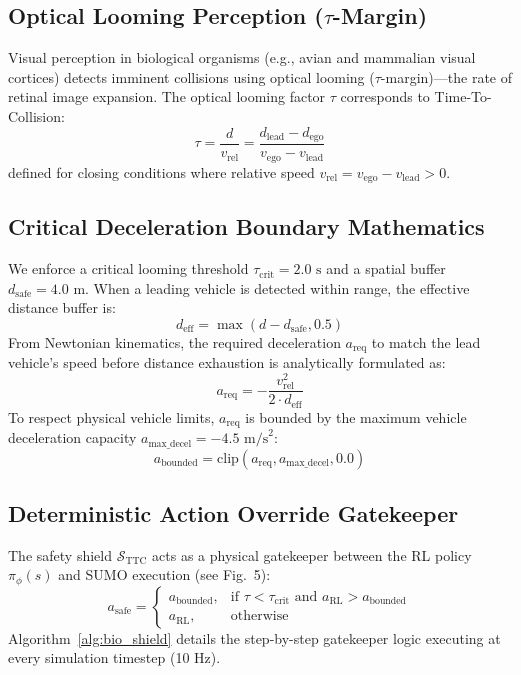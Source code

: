 \documentclass{svproc}
\begin{document}
\subsection{Optical Looming Perception ($\tau$-Margin)}
Visual perception in biological organisms (e.g., avian and mammalian visual cortices) detects imminent collisions using optical looming ($\tau$-margin)---the rate of retinal image expansion. The optical looming factor $\tau$ corresponds to Time-To-Collision:
\begin{equation}\label{eq:tau}
\tau = \frac{d}{v_{\text{rel}}} = \frac{d_{\text{lead}} - d_{\text{ego}}}{v_{\text{ego}} - v_{\text{lead}}}
\end{equation}
defined for closing conditions where relative speed $v_{\text{rel}} = v_{\text{ego}} - v_{\text{lead}} > 0$.

\subsection{Critical Deceleration Boundary Mathematics}
We enforce a critical looming threshold $\tau_{\text{crit}} = 2.0\text{ s}$ and a spatial buffer $d_{\text{safe}} = 4.0\text{ m}$. When a leading vehicle is detected within range, the effective distance buffer is:
\begin{equation}
d_{\text{eff}} = \max\left(d - d_{\text{safe}}, 0.5\right)
\end{equation}
From Newtonian kinematics, the required deceleration $a_{\text{req}}$ to match the lead vehicle's speed before distance exhaustion is analytically formulated as:
\begin{equation}\label{eq:areq}
a_{\text{req}} = -\frac{v_{\text{rel}}^2}{2 \cdot d_{\text{eff}}}
\end{equation}
To respect physical vehicle limits, $a_{\text{req}}$ is bounded by the maximum vehicle deceleration capacity $a_{\text{max\_decel}} = -4.5\text{ m/s}^2$:
\begin{equation}
a_{\text{bounded}} = \text{clip}\left(a_{\text{req}}, a_{\text{max\_decel}}, 0.0\right)
\end{equation}

\subsection{Deterministic Action Override Gatekeeper}
The safety shield $\mathcal{S}_{\text{TTC}}$ acts as a physical gatekeeper between the RL policy $\pi_\phi(s)$ and SUMO execution (see Fig.~5):
\begin{equation}\label{eq:override}
a_{\text{safe}} = \begin{cases} 
a_{\text{bounded}}, & \text{if } \tau < \tau_{\text{crit}} \text{ and } a_{\text{RL}} > a_{\text{bounded}} \\
a_{\text{RL}}, & \text{otherwise}
\end{cases}
\end{equation}
Algorithm~\ref{alg:bio_shield} details the step-by-step gatekeeper logic executing at every simulation timestep (10 Hz).
\end{document}
